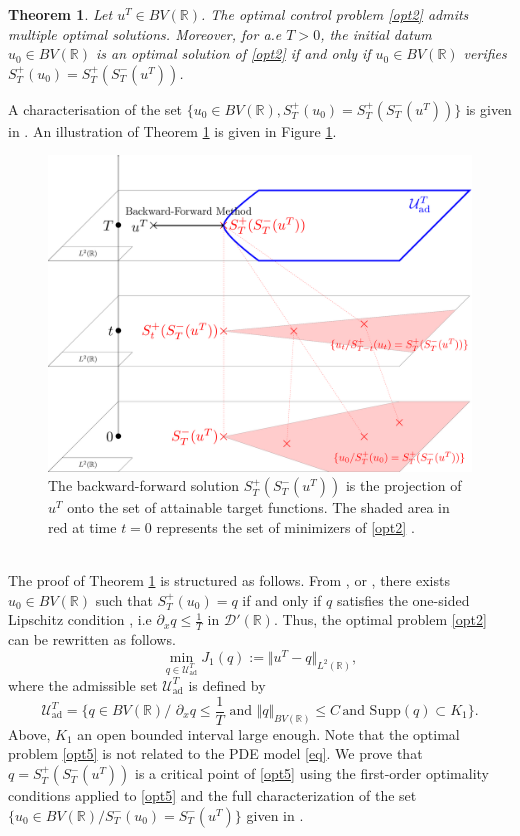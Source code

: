 \documentclass{article}
\newtheorem{theorem}{Theorem}[section]
\newcommand{\R}{\mathbb R}
\begin{document}
\begin{theorem}  \label{main:optimal} Let $u^T\in BV(\mathbb R)$. The optimal control problem \eqref{opt2}  admits multiple optimal solutions. Moreover, for a.e $T>0$, the initial datum $u_0\in BV(\mathbb R)$ is an optimal solution of \eqref{opt2} if and only if $u_0 \in BV(\mathbb R)$ verifies $S_T^+(u_0)=S_T^+ (S_T^-(u^T))$.
\end{theorem} 
A characterisation of the set $\{u_0 \in BV(\mathbb R), S_T^+(u_0)=S_T^+ (S_T^-(u^T))\}$ is given in \cite{CP19}. An illustration of Theorem \ref{main:optimal} is given in Figure \ref{projection}. 
\begin{figure}[h!]
  \centering
      \includegraphics[width=0.65\linewidth]{projection2.pdf}
  \caption{The backward-forward  solution $S_T^+(S_T^-(u^T))$ is the projection of $u^T$ onto the set of attainable target functions. The shaded area in red at time $t=0$ represents the set of minimizers of \eqref{opt2}  \label{projection}.}
\end{figure}  \ \\
The proof of Theorem \ref{main:optimal} is structured as follows. From  \cite[Theorem 3.1, Corollary 3.2]{CP19}, \cite[Corollary 1]{GZ17} or \cite{GG14}, there exists $u_0\in BV(\mathbb R)$ such that $S^+_T(u_0)=q$ if and only if $q$ satisfies  the one-sided Lipschitz condition \cite{BC98,Gla08,Ole57,Daf10}, i.e 
$ \partial_x q \leq \frac{1}{T}  \text{ in } \mathcal{D}'(\R).$
 Thus, the optimal problem \eqref{opt2} can be rewritten as  follows. 
 \begin{equation} \label{opt5} \min_{q\in \mathcal{U}^T_{\text{ad}}} J_1(q):=\Vert u^T-q \Vert_{L^2(\R)}, \end{equation}
where the admissible set $\mathcal{U}^T_{\text{ad}}$ is defined by 
$$\mathcal{U}^T_{\text{ad}}=\{ q\in BV(\mathbb R) \slash \, \, \partial_x q \leq \frac{1}{T} \,  \, \text{and } \Vert q \Vert_{BV( \mathbb R)} \leq C \, \text{and }\text{Supp}(q)\subset K_1 \}.$$
Above, $K_1$ an open bounded interval large enough.  Note that the optimal problem \eqref{opt5} is not related to the PDE model \eqref{eq}. We prove that $q=S_T^+ (S_T^-(u^T))$ is a critical point of \eqref{opt5} using the first-order optimality conditions applied to \eqref{opt5} and the full characterization of the set $ \{u_0 \in BV(\mathbb R) \slash S_T^-(u_0)=S_T^-(u^T)\}$ given in \cite[Theorem A.2]{LZ19}. \ \\
\end{document}
